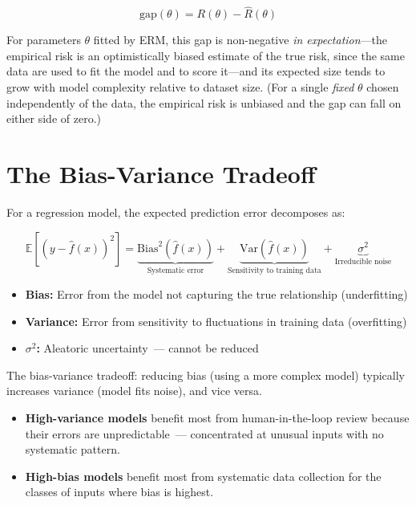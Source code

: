 \[
\mathrm{gap}(\theta) = R(\theta) - \hat{R}(\theta)
\]

For parameters $\theta$ fitted by ERM, this gap is non-negative \emph{in expectation}---the empirical risk is an optimistically biased estimate of the true risk, since the same data are used to fit the model and to score it---and its expected size tends to grow with model complexity relative to dataset size. (For a single \emph{fixed} $\theta$ chosen independently of the data, the empirical risk is unbiased and the gap can fall on either side of zero.)

\section{The Bias-Variance Tradeoff}

For a regression model, the expected prediction error decomposes as:

\[
\mathbb{E}\!\left[(y - \hat{f}(x))^2\right]
= \underbrace{\mathrm{Bias}^2\!\left(\hat{f}(x)\right)}_{\text{Systematic error}}
+ \underbrace{\mathrm{Var}\!\left(\hat{f}(x)\right)}_{\text{Sensitivity to training data}}
+ \underbrace{\sigma^2}_{\text{Irreducible noise}}
\]

\begin{itemize}
    \item \textbf{Bias:} Error from the model not capturing the true relationship (underfitting)
    \item \textbf{Variance:} Error from sensitivity to fluctuations in training data (overfitting)
    \item \textbf{$\sigma^2$:} Aleatoric uncertainty~--- cannot be reduced
\end{itemize}

The bias-variance tradeoff: reducing bias (using a more complex model) typically increases variance (model fits noise), and vice versa.

\begin{examplebox}
\begin{itemize}
    \item \textbf{High-variance models} benefit most from human-in-the-loop review because their errors are unpredictable~--- concentrated at unusual inputs with no systematic pattern.
    \item \textbf{High-bias models} benefit most from systematic data collection for the classes of inputs where bias is highest.
\end{itemize}
\end{examplebox}

